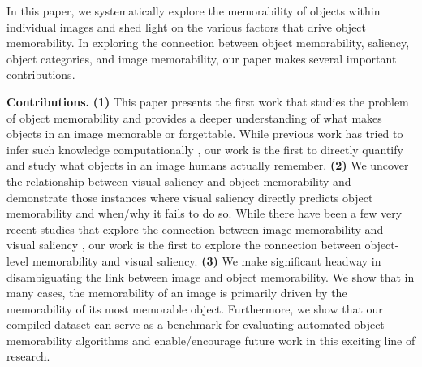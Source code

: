 In this paper, we systematically explore the memorability of objects within individual images and shed light on the various factors that drive object memorability. In exploring the connection between object memorability, saliency, object categories, and image memorability, our paper makes several important contributions.

\vspace{3pt}\noindent\textbf{Contributions.} \textbf{(1)} This paper presents the first work that studies the problem of object memorability and provides a deeper understanding of what makes objects in an image memorable or forgettable. While previous work has tried to infer such knowledge  computationally \cite{khosla12}, our work is the first to directly quantify and study what objects in an image humans actually remember.  \textbf{(2)} We uncover the relationship between visual saliency and object memorability and demonstrate those instances where visual saliency directly predicts object memorability and when/why it fails to do so. While there have been a few very recent studies that explore the connection between image memorability and visual saliency \cite{zoya15,lemeur13,kim13}, our work is the first to explore the connection between object-level memorability and visual saliency. %
\textbf{(3)} We make significant headway in disambiguating the link between image and object memorability. We show that in many cases, the memorability of an image is primarily driven by the memorability of its most memorable object. %
Furthermore, we show that our compiled dataset can serve as a benchmark for evaluating automated object memorability algorithms and enable/encourage future work in this exciting line of research.%
